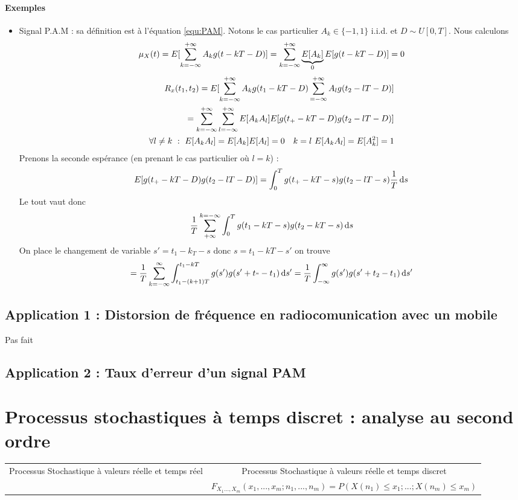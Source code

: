 \documentclass[11pt,a4paper]{article}
\numberwithin{equation}{section}
\begin{document}
\paragraph{Exemples}
\begin{itemize}
    \item Signal P.A.M : sa définition est à l'équation \ref{equ:PAM}. Notons le cas particulier $A_k \in \{-1,1\}$ i.i.d. et $D \sim U[0,T]$. Nous calculons
     \[\mu_X(t) = E[\somme{+\infty}{k=-\infty} A_k g(t-kT-D)] = \somme{+\infty}{k=-\infty} \underbrace{E[A_k]}_0 E[g(t-kT-D)] = 0\]
     \begin{align}
    R_x(t_1,t_2) = E[\somme{+\infty}{k=-\infty} A_k g(t_1-kT-D) \somme{+\infty}{=-\infty} A_l g(t_2-lT-D)]\\ = \somme{+\infty}{k=-\infty}\somme{+\infty}{l=-\infty} E[A_k A_l]E[ g(t_+-kT-D)g(t_2-lT-D)]\\
    \forall l\neq k\ :\ E[A_kA_l] = E[A_k]E[A_l]= 0\quad k=l\ E[A_kA_l] = E[A_k^2] = 1
\end{align}
Prenons la seconde espérance (en prenant le cas particulier où $l=k$) :
\begin{align}
    E[ g(t_+-kT-D)g(t_2-lT-D)] = \int_0^Tg(t_+-kT-s)g(t_2-lT-s) \frac{1}{T}\deriv s
\end{align}
Le tout vaut donc
\[\frac{1}{T}\somme{k=-\infty}{+\infty} \int_0^T g(t_1-kT-s)g(t_2-kT-s) \deriv s \]
On place le changement de  variable $s' = t_1-k_T-s$ donc $s=t_1-kT-s'$ on trouve
\[=\frac{1}{T} \somme{\infty}{k=-\infty} \int_{t_1-(k+1)T}^{t_1-kT} g(s')g(s'+t_"-t_1) \deriv s' = \frac{1}{T} \infint g(s')g(s'+t_2-t_1)\deriv s'\]
\end{itemize}

\subsection{Application 1 : Distorsion de fréquence en radiocomunication avec un mobile}
Pas fait

\subsection{Application 2 : Taux d'erreur d'un signal PAM}


\section{Processus stochastiques à temps discret : analyse au second ordre}
    
\begin{table}
    \begin{tabular}{c|c}
    Processus Stochastique à valeurs réelle et temps réel & Processus Stochastique à valeurs réelle et temps discret\\
    &$F_{X_1...,X_m}(x_1,...,x_m;n_1,...,n_m) =P(X(n_1) \leq x_1;...;X(n_m) \leq x_m)$
\end{tabular}
\end{table}
\end{document}
